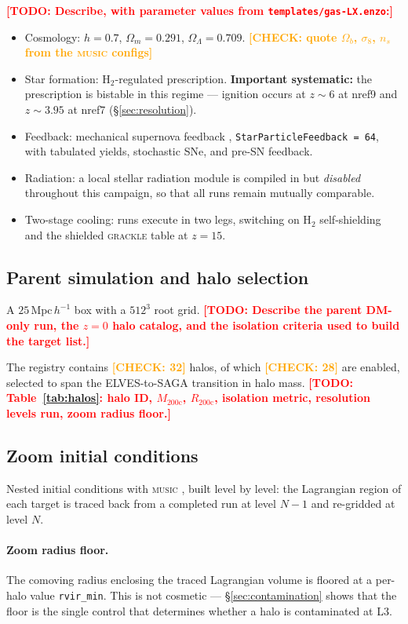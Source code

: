 \documentclass[twocolumn,linenumbers]{aastex631}
\newcommand{\todo}[1]{\textcolor{red}{\textbf{[TODO: #1]}}}
\newcommand{\check}[1]{\textcolor{orange}{\textbf{[CHECK: #1]}}}
\newcommand{\Mvir}{\ensuremath{M_{200\mathrm{c}}}}
\newcommand{\Rvir}{\ensuremath{R_{200\mathrm{c}}}}
\newcommand{\music}{\textsc{music}}
\newcommand{\grackle}{\textsc{grackle}}
\begin{document}
\todo{Describe, with parameter values from \texttt{templates/gas-LX.enzo}:}
\begin{itemize}
\item Cosmology: $h=0.7$, $\Omega_m = 0.291$, $\Omega_\Lambda = 0.709$.
      \check{quote $\Omega_b$, $\sigma_8$, $n_s$ from the \music{} configs}
\item Star formation: H$_2$-regulated prescription. \textbf{Important
      systematic:} the prescription is bistable in this regime --- ignition
      occurs at $z\sim6$ at nref9 and $z\sim3.95$ at nref7
      (\S\ref{sec:resolution}).
\item Feedback: mechanical supernova feedback \citep[][Cassi's
      implementation]{Lochhaas2023}, \texttt{StarParticleFeedback = 64},
      with tabulated yields, stochastic SNe, and pre-SN feedback.
\item Radiation: a local stellar radiation module is compiled in but
      \emph{disabled} throughout this campaign, so that all runs remain
      mutually comparable.
\item Two-stage cooling: runs execute in two legs, switching on H$_2$
      self-shielding and the shielded \grackle{} table at $z=15$.
\end{itemize}

\subsection{Parent simulation and halo selection}
\label{sec:selection}

A $25\,\mathrm{Mpc}\,h^{-1}$ box with a $512^3$ root grid.
\todo{Describe the parent DM-only run, the $z=0$ halo catalog, and the
isolation criteria used to build the target list.}

The registry contains \check{32} halos, of which \check{28} are enabled,
selected to span the ELVES-to-SAGA transition in halo mass.
\todo{Table~\ref{tab:halos}: halo ID, \Mvir, \Rvir, isolation metric,
resolution levels run, zoom radius floor.}

\subsection{Zoom initial conditions}
\label{sec:ics}

Nested initial conditions with \music{} \citep{Hahn2011}, built level by
level: the Lagrangian region of each target is traced back from a completed
run at level $N-1$ and re-gridded at level $N$.

\paragraph{Zoom radius floor.} The comoving radius enclosing the traced
Lagrangian volume is floored at a per-halo value \texttt{rvir\_min}. This is
not cosmetic --- \S\ref{sec:contamination} shows that the floor is the single
control that determines whether a halo is contaminated at L3.
\end{document}
